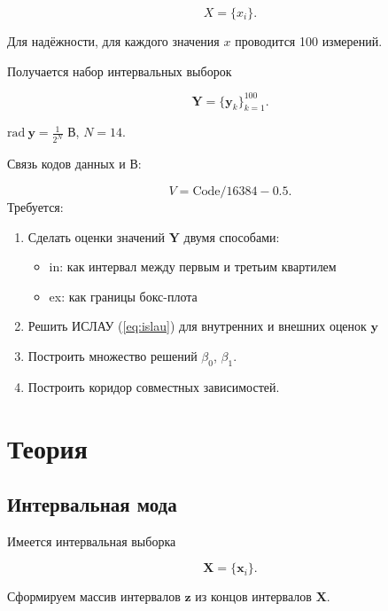 \documentclass[a4paper,14pt]{article}
\begin{document}
  \begin{equation}
    X = \{ x_i \}.
  \end{equation}

  Для надёжности, для каждого значения \( x \) проводится 100 измерений.

  Получается набор интервальных выборок

  \begin{equation}
    \mathbf{Y} = \{ \mathbf{y}_k \}_{k=1}^{100}.
  \end{equation}

  \( \text{rad}~\mathbf{y} = \frac{1}{2^N} \) В, \( N = 14 \).

  Связь кодов данных и В:

  \begin{equation}
    V = \text{Code} / 16384 - 0.5.
  \end{equation}
  Требуется:
  \begin{enumerate}
    \item   Сделать оценки значений \( \mathbf{Y} \) двумя способами:

    \begin{itemize}
      \item in: как интервал между первым и третьим квартилем
      \item ex: как границы бокс-плота
    \end{itemize}
  
    \item Решить ИСЛАУ (\ref{eq:islau}) для внутренних и внешних оценок
    \( \mathbf{y} \)
  
    \item Построить множество решений \( \beta_0 \), \( \beta_1 \).
  
    \item Построить коридор совместных зависимостей.
  \end{enumerate}
  \section{Теория}

  \subsection{Интервальная мода}

  Имеется интервальная выборка

  \[
    \mathbf{X} = \{ \mathbf{x}_i \}.
  \]

  Сформируем массив интервалов \( \mathbf{z} \) из концов интервалов
  \( \mathbf{X} \).
\end{document}
